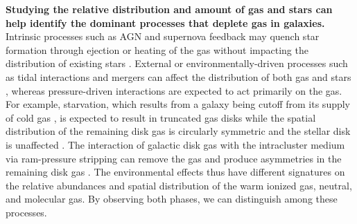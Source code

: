 \documentclass[11pt, preprint]{aastex}
\begin{document}
{\bf Studying the relative distribution
and amount of gas and stars can help identify the dominant processes
that deplete gas in galaxies. }
Intrinsic processes such as AGN and supernova feedback may quench star formation through
ejection or heating of the gas without impacting the distribution of
existing stars \citep[e.g.][]{springel05,
  croton06, dekel06}.  External or environmentally-driven processes 
such as tidal interactions and
mergers can
affect the distribution of both gas and stars \citep{springel05,
  croton06, dekel06}, whereas pressure-driven interactions are expected to
act primarily on the gas.  For example, starvation, which results from
a galaxy being cutoff from its supply of cold gas \citep{Larson80}, is
expected to result in
truncated gas disks while the spatial distribution of the
remaining disk gas is circularly symmetric and the stellar disk is unaffected \citep[e.g.][]{kawata08}. 
The interaction of galactic disk gas with the intracluster medium via
ram-pressure stripping can remove the gas and produce asymmetries in
the remaining disk gas \citep[e.g.][]{quilis00,crowl05}.  
{The environmental effects thus
have different signatures on the relative abundances and spatial
distribution of the warm ionized gas, neutral, and molecular gas.  By
observing both 
phases, we can distinguish among these processes.}
 

\end{document}
